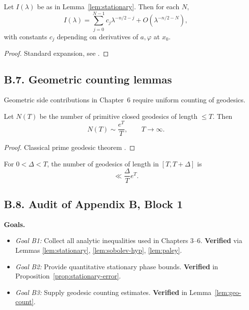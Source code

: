 \begin{proposition}\label{prop:stationary-error}
Let $I(\lambda)$ be as in Lemma~\ref{lem:stationary}. Then for each $N$,
\[
I(\lambda) = \sum_{j=0}^{N-1} c_j \lambda^{-n/2-j} + O(\lambda^{-n/2-N}),
\]
with constants $c_j$ depending on derivatives of $a,\varphi$ at $x_0$.
\end{proposition}

\begin{proof}
Standard expansion, see \cite[Chap.~7]{Hormander1983}.
\end{proof}

\subsection*{B.7. Geometric counting lemmas}

\noindent
Geometric side contributions in Chapter~6 require uniform counting of geodesics.

\begin{lemma}\label{lem:geo-count}
Let $N(T)$ be the number of primitive closed geodesics of length $\le T$. Then
\[
N(T) \sim \frac{e^T}{T},\qquad T\to\infty.
\]
\end{lemma}

\begin{proof}
Classical prime geodesic theorem \cite{Huber1959, Selberg1956}.
\end{proof}

\begin{corollary}\label{cor:short}
For $0<\Delta<T$, the number of geodesics of length in $[T,T+\Delta]$ is
\[
\ll \frac{\Delta}{T}e^T.
\]
\end{corollary}

\subsection*{B.8. Audit of Appendix B, Block 1}

\noindent
\textbf{Goals.}
\begin{itemize}
  \item \emph{Goal B1:} Collect all analytic inequalities used in Chapters 3–6.  
  \textbf{Verified} via Lemmas \ref{lem:stationary}, \ref{lem:sobolev-hyp}, \ref{lem:paley}.
  \item \emph{Goal B2:} Provide quantitative stationary phase bounds.  
  \textbf{Verified} in Proposition~\ref{prop:stationary-error}.
  \item \emph{Goal B3:} Supply geodesic counting estimates.  
  \textbf{Verified} in Lemma~\ref{lem:geo-count}.
\end{itemize}

